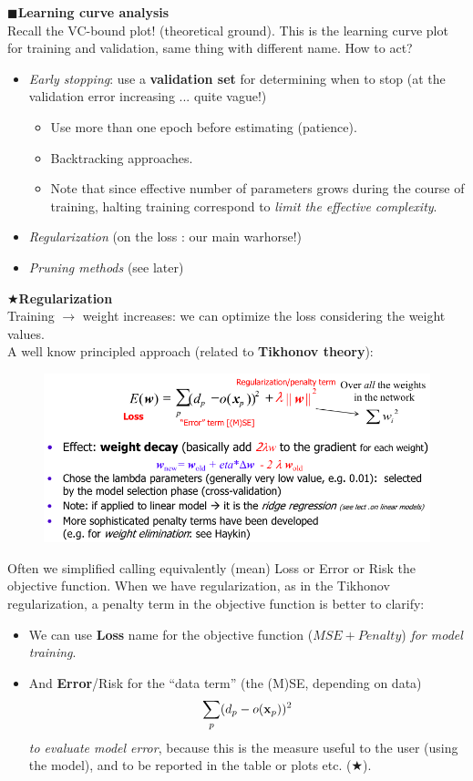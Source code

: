 \documentclass[../main.tex]{subfiles}
\begin{document}
\noindent$\blacksquare$\textbf{Learning curve analysis}\\
Recall the VC-bound plot! (theoretical ground). This is the learning curve plot for training and validation, same thing with different name. How to act?
\begin{itemize}
    \item \emph{Early stopping}: use a \textbf{validation set} for determining when to stop (at the validation error increasing ... quite vague!)
    \begin{itemize}
        \item Use more than one epoch before estimating (patience).
        \item Backtracking approaches.
        \item Note that since effective number of parameters grows during the course of training, halting training correspond to \emph{limit the effective complexity}.
    \end{itemize}
    \item \emph{Regularization} (on the loss : our main warhorse!)
    \item \emph{Pruning methods} (see later)
\end{itemize}
$\bigstar$\textbf{Regularization}\\
\noindent Training $\rightarrow$ weight increases: we can optimize the loss considering the weight values.\\
A well know principled approach (related to \textbf{Tikhonov theory}):
\begin{figure}[H]
    \centering
    \includegraphics[scale = 0.4]{lectures/4_neural_networks/4_penalty_term.png}
    \label{fig:4_penalty_term}
\end{figure}
\noindent Often we simplified calling equivalently (mean) Loss or Error or Risk the objective function. When we have regularization, as in the Tikhonov regularization, a penalty term in the objective function is better to clarify:
\begin{itemize}
    \item We can use \textbf{Loss} name for the objective function ($MSE+Penalty$) \emph{for model training}.
    \item And \textbf{Error}/Risk for the “data term” (the (M)SE, depending on data)
    $$\sum_{p}(d_p-o(\bold{x}_p))^2$$
    \emph{to evaluate model error}, because this is the measure useful to the user (using the model), and to be reported in the table or plots etc. ($\bigstar$).
\end{itemize}
\end{document}
